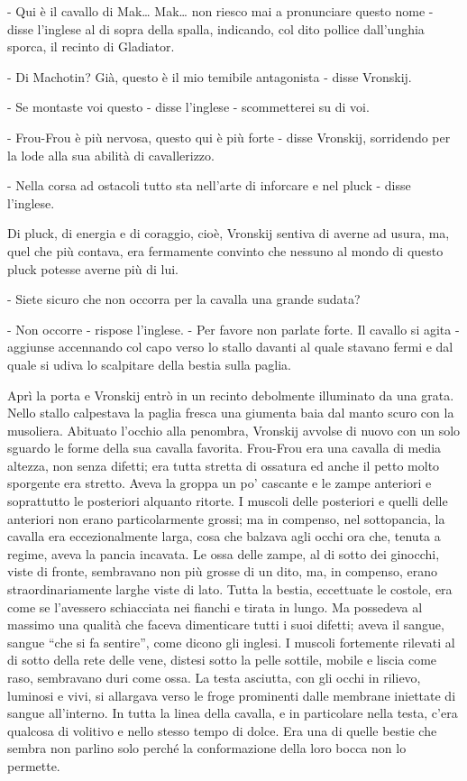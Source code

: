 - Qui è il cavallo di Mak\ldots{} Mak\ldots{} non riesco mai a pronunciare questo nome - disse l'inglese al di sopra della spalla, indicando, col dito pollice dall'unghia sporca, il recinto di Gladiator. 

- Di Machotin? Già, questo è il mio temibile antagonista - disse Vronskij. 

- Se montaste voi questo - disse l'inglese - scommetterei su di voi. 

- Frou-Frou è più nervosa, questo qui è più forte - disse Vronskij, sorridendo per la lode alla sua abilità di cavallerizzo. 

- Nella corsa ad ostacoli tutto sta nell'arte di inforcare e nel pluck - disse l'inglese. 

Di pluck, di energia e di coraggio, cioè, Vronskij sentiva di averne ad usura, ma, quel che più contava, era fermamente convinto che nessuno al mondo di questo pluck potesse averne più di lui. 

- Siete sicuro che non occorra per la cavalla una grande sudata? 

- Non occorre - rispose l'inglese. - Per favore non parlate forte. Il cavallo si agita - aggiunse accennando col capo verso lo stallo davanti al quale stavano fermi e dal quale si udiva lo scalpitare della bestia sulla paglia. 

Aprì la porta e Vronskij entrò in un recinto debolmente illuminato da una grata. Nello stallo calpestava la paglia fresca una giumenta baia dal manto scuro con la musoliera. Abituato l'occhio alla penombra, Vronskij avvolse di nuovo con un solo sguardo le forme della sua cavalla favorita. Frou-Frou era una cavalla di media altezza, non senza difetti; era tutta stretta di ossatura ed anche il petto molto sporgente era stretto. Aveva la groppa un po' cascante e le zampe anteriori e soprattutto le posteriori alquanto ritorte. I muscoli delle posteriori e quelli delle anteriori non erano particolarmente grossi; ma in compenso, nel sottopancia, la cavalla era eccezionalmente larga, cosa che balzava agli occhi ora che, tenuta a regime, aveva la pancia incavata. Le ossa delle zampe, al di sotto dei ginocchi, viste di fronte, sembravano non più grosse di un dito, ma, in compenso, erano straordinariamente larghe viste di lato. Tutta la bestia, eccettuate le costole, era come se l'avessero schiacciata nei fianchi e tirata in lungo. Ma possedeva al massimo una qualità che faceva dimenticare tutti i suoi difetti; aveva il sangue, sangue ``che si fa sentire'', come dicono gli inglesi. I muscoli fortemente rilevati al di sotto della rete delle vene, distesi sotto la pelle sottile, mobile e liscia come raso, sembravano duri come ossa. La testa asciutta, con gli occhi in rilievo, luminosi e vivi, si allargava verso le froge prominenti dalle membrane iniettate di sangue all'interno. In tutta la linea della cavalla, e in particolare nella testa, c'era qualcosa di volitivo e nello stesso tempo di dolce. Era una di quelle bestie che sembra non parlino solo perché la conformazione della loro bocca non lo permette. 

